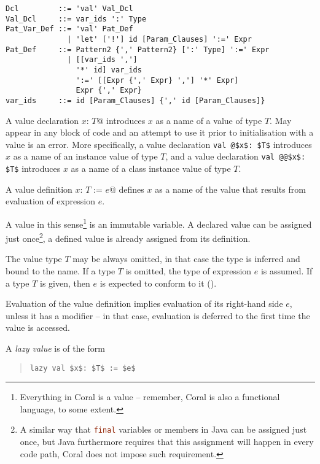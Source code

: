 \syntax\begin{lstlisting}
Dcl         ::= 'val' Val_Dcl
Val_Dcl     ::= var_ids ':' Type
Pat_Var_Def ::= 'val' Pat_Def
              | 'let' ['!'] id [Param_Clauses] ':=' Expr
Pat_Def     ::= Pattern2 {',' Pattern2} [':' Type] ':=' Expr
              | [[var_ids ','] 
                '*' id] var_ids
                ':=' [[Expr {',' Expr} ','] '*' Expr] 
                Expr {',' Expr}
var_ids     ::= id [Param_Clauses] {',' id [Param_Clauses]}
\end{lstlisting}

A value declaration \lstinline@val $x$: $T$@ introduces $x$ as a name of a value of type $T$. May appear in any block of code and an attempt to use it prior to initialisation with a value is an error. More specifically, a value declaration \lstinline+val @$x$: $T$+ introduces $x$ as a name of an instance value of type $T$, and a value declaration \lstinline+val @@$x$: $T$+ introduces $x$ as a name of a class instance value of type $T$. 

A value definition \lstinline@val $x$: $T$ := $e$@ defines $x$ as a name of the value that results from evaluation of expression $e$.

A value in this sense\footnote{Everything in Coral is a value -- remember, Coral is also a functional language, to some extent.} is an immutable variable. A declared value can be assigned just once\footnote{A similar way that \lstinline[language=Java]@final@ variables or members in Java can be assigned just once, but Java furthermore requires that this assignment will happen in every code path, Coral does not impose such requirement.}, a defined value is already assigned from its definition. 

The value type $T$ may be always omitted, in that case the type is inferred and bound to the name. If a type $T$ is omitted, the type of expression $e$ is assumed. If a type $T$ is given, then $e$ is expected to conform to it (). 

Evaluation of the value definition implies evaluation of its right-hand side $e$, unless it has a modifier  -- in that case, evaluation is deferred to the first time the value is accessed. 

A {\em lazy value} is of the form
\begin{quote}\begin{lstlisting}
lazy val $x$: $T$ := $e$
\end{lstlisting}\end{quote}

